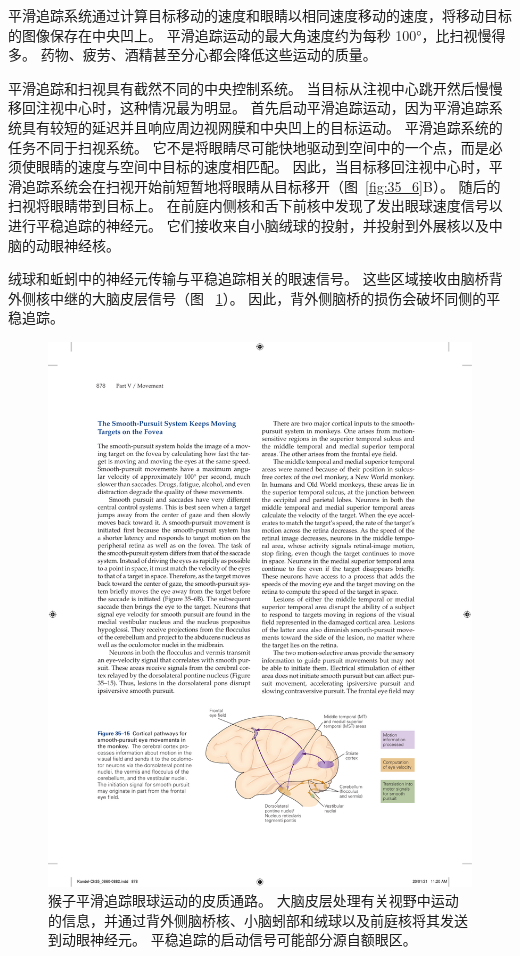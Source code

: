 平滑追踪系统通过计算目标移动的速度和眼睛以相同速度移动的速度，将移动目标的图像保存在中央凹上。
平滑追踪运动的最大角速度约为每秒 100°，比扫视慢得多。 药物、疲劳、酒精甚至分心都会降低这些运动的质量。


平滑追踪和扫视具有截然不同的中央控制系统。
当目标从注视中心跳开然后慢慢移回注视中心时，这种情况最为明显。
首先启动平滑追踪运动，因为平滑追踪系统具有较短的延迟并且响应周边视网膜和中央凹上的目标运动。
平滑追踪系统的任务不同于扫视系统。
它不是将眼睛尽可能快地驱动到空间中的一个点，而是必须使眼睛的速度与空间中目标的速度相匹配。
因此，当目标移回注视中心时，平滑追踪系统会在扫视开始前短暂地将眼睛从目标移开（图~\ref{fig:35_6}B）。
随后的扫视将眼睛带到目标上。
在前庭内侧核和舌下前核中发现了发出眼球速度信号以进行平稳追踪的神经元。
它们接收来自小脑绒球的投射，并投射到外展核以及中脑的动眼神经核。


绒球和蚯蚓中的神经元传输与平稳追踪相关的眼速信号。 
这些区域接收由脑桥背外侧核中继的大脑皮层信号（图 ~\ref{fig:35_15}）。
因此，背外侧脑桥的损伤会破坏同侧的平稳追踪。


\begin{figure}[htbp]
	\centering
	\includegraphics[width=0.7\linewidth]{chap35/fig_35_15}
	\caption{猴子平滑追踪眼球运动的皮质通路。 大脑皮层处理有关视野中运动的信息，并通过背外侧脑桥核、小脑蚓部和绒球以及前庭核将其发送到动眼神经元。 平稳追踪的启动信号可能部分源自额眼区。}
	\label{fig:35_15}
\end{figure}


